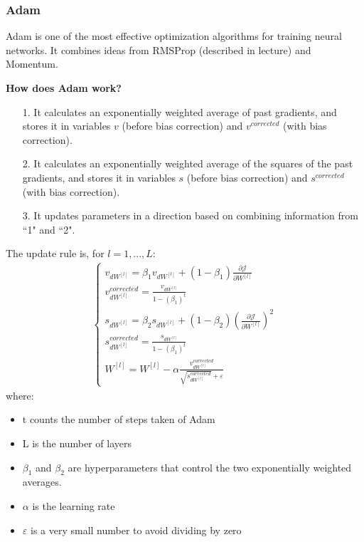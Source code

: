 {\subsubsection{Adam}

Adam is one of the most effective optimization algorithms for training neural networks. It combines ideas from RMSProp (described in lecture) and Momentum. 

{\textbf{How does Adam work?}}
\begin{itemize}
\item[1.] It calculates an exponentially weighted average of past gradients, and stores it in variables $v$ (before bias correction) and $v^{corrected}$ (with bias correction). 
\item[2.] It calculates an exponentially weighted average of the squares of the past gradients, and  stores it in variables $s$ (before bias correction) and $s^{corrected}$ (with bias correction). 
\item[3.] It updates parameters in a direction based on combining information from ``1" and ``2".
\end{itemize}
The update rule is, for $l = 1, ..., L$: 
\begin{align}
\begin{cases}
v_{dW^{[l]}} = \beta_1 v_{dW^{[l]}} + (1 - \beta_1) \frac{\partial \mathcal{J} }{ \partial W^{[l]} } \\
v^{corrected}_{dW^{[l]}} = \frac{v_{dW^{[l]}}}{1 - (\beta_1)^t} \\
s_{dW^{[l]}} = \beta_2 s_{dW^{[l]}} + (1 - \beta_2) (\frac{\partial \mathcal{J} }{\partial W^{[l]} })^2 \\
s^{corrected}_{dW^{[l]}} = \frac{s_{dW^{[l]}}}{1 - (\beta_1)^t} \\
W^{[l]} = W^{[l]} - \alpha \frac{v^{corrected}_{dW^{[l]}}}{\sqrt{s^{corrected}_{dW^{[l]}}} + \varepsilon}
\end{cases}
\end{align}
where:
\begin{itemize}
\item t counts the number of steps taken of Adam 
\item L is the number of layers
\item $\beta_1$ and $\beta_2$ are hyperparameters that control the two exponentially weighted averages. 
\item $\alpha$ is the learning rate
\item $\varepsilon$ is a very small number to avoid dividing by zero
\end{itemize}

}
